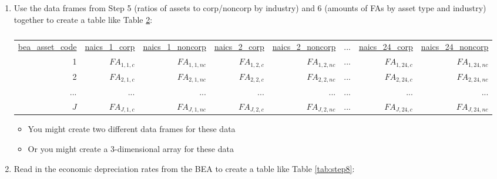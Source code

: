 \documentclass[a4paper]{article}
\begin{document}
\begin{enumerate}
\begin{enumerate}
\begin{table}[h!]
\begin{tabular}{rrrrr}
    \end{tabular}%
  \label{tab:step6}%
\end{table}%
	
	\end{enumerate}
\item Use the data frames from Step 5 (ratios of assets to corp/noncorp by industry) and 6 (amounts of FAs by asset type and industry) together to create a table like Table \ref{tab:step7}:

\begin{table}[h!]
  \centering
  \caption{}
    \begin{tabular}{rrrrrrrr}
    
    \underline{bea\_asset\_code} & \underline{naics\_1\_corp} & \underline{naics\_1\_noncorp} & \underline{naics\_2\_corp} & \underline{naics\_2\_noncorp} & ...     & \underline{naics\_24\_corp} & \underline{naics\_24\_noncorp} \\
    
    1     & $FA_{1,1,c}$ & $FA_{1,1,nc}$ & $FA_{1,2,c}$ & $FA_{1,2,nc}$ & ...    & $FA_{1,24,c}$ & $FA_{1,24,nc}$ \\
    2     & $FA_{2,1,c}$ & $FA_{2,1,nc}$ & $FA_{2,2,c}$ & $FA_{2,2,nc}$ & ...     & $FA_{2,24,c}$ & $FA_{2,24,nc}$ \\
    ...     & ...     & ...     & ...     & ...   & ...     & ...     & ... \\
    $J$   & $FA_{J,1,c}$ & $FA_{J,1,nc}$ & $FA_{J,2,c}$ & $FA_{J,2,nc}$ & ...     & $FA_{J,24,c}$ & $FA_{J,24,nc}$ \\
    
    \end{tabular}%
  \label{tab:step7}%
\end{table}%

	
	\begin{itemize}
	\item You might create two different data frames for these data
	\item Or you might create a 3-dimensional array for these data
	\end{itemize}
\item Read in the economic depreciation rates from the BEA to create a table like Table \ref{tab:step8}:
	
\begin{table}[h!]
  \centering
  \caption{}
    \begin{tabular}{rr}
    

\end{tabular}
\end{table}
\end{enumerate}
\end{document}
